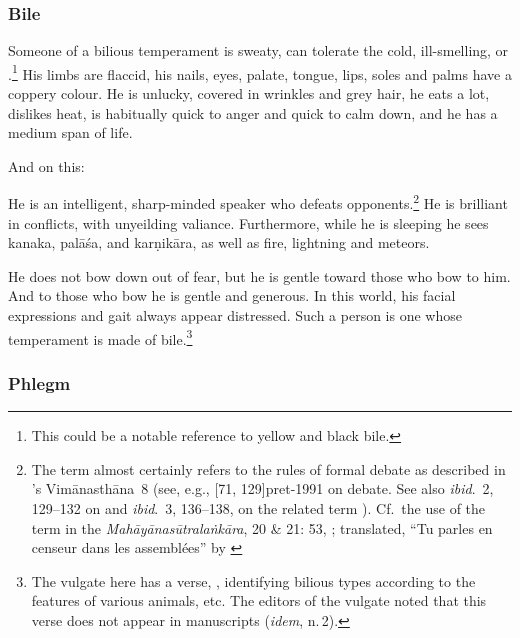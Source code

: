 \begin{translation}
 \subsubsection{Bile}
 
 \item[68]
 
Someone of a bilious temperament is sweaty, can tolerate the cold, ill-smelling,  or .\footnote{This could be a notable reference to yellow and black bile.} His limbs are flaccid, his nails, eyes, palate, tongue, lips, soles and palms have a coppery colour.  He is unlucky, covered in wrinkles and grey hair, he eats a lot, dislikes heat, is habitually quick to anger and quick to calm down, and he has a medium span of life. 
    
\item[69--70]

And on this:
\begin{sloka}
    He is an intelligent, sharp-minded speaker who defeats
opponents.\footnote{The term  almost certainly
    refers to the rules of formal debate as described in \CS's
    Vimānasthāna~8  (see, e.g., [71, 129]{pret-1991} on
    debate.  See also \emph{ibid}.\ 2, 129--132 on
     and \emph{ibid}.\ 3, 136--138, on the related
    term ). Cf.\ the use of the term in the
    \emph{Mahāyānasūtralaṅkāra}, 20 \& 21: 53,
    \parencites[186]{levi-1907}[181]{dvar-1985}; translated, “Tu
    parles en censeur dans les assembl\'ees” by \citet[303]{levi-1907}}
    He is brilliant in conflicts, with unyeilding valiance. Furthermore, while he
    is sleeping he sees \gls{kanaka}, \gls{palāśa}, and
    \gls{karṇikāra}, as well as fire, lightning and meteors.
\end{sloka}
\begin{sloka}
    He does not bow down out of fear, but he is gentle toward those who bow to him.  And to those who bow he is gentle and generous. 
    In this world, his facial expressions and gait always appear distressed. Such a person is one whose temperament is made of bile.\footnote{The vulgate here has a verse, , identifying bilious types according to the features of various animals, etc. The editors of the vulgate noted that this verse does not appear in manuscripts (\emph{idem}, n.\,2).}
\end{sloka}


 \subsubsection{Phlegm}
 

\end{translation}
